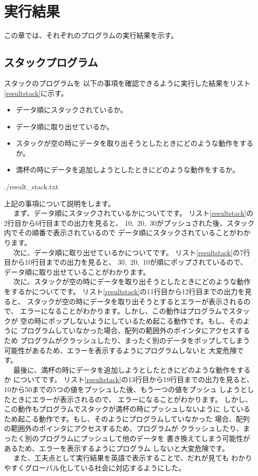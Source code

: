 \documentclass[a4j]{jarticle}
\begin{document}
\section{実行結果}
この章では、それぞれのプログラムの実行結果を示す。
\subsection{スタックプログラム}
\label{sec:stackresult}
スタックのプログラムを
以下の事項を確認できるように実行した結果をリスト\ref{resultstack}に示す。
\begin{itemize}
  \item データ順にスタックされているか。
  \item データ順に取り出せているか。
  \item スタックが空の時にデータを取り出そうとしたときにどのような動作をするか。
  \item 満杯の時にデータを追加しようとしたときにどのような動作をするか。
\end{itemize}

\begin{lstinputlisting}[caption=スタックプログラムの実行結果,label=resultstack]{./result_stack.txt}
\end{lstinputlisting}

上記の事項について説明をします。
\\~~
まず、データ順にスタックされているかについてです。
リスト\ref{resultstack}の2行目から6行目までの出力を見ると、
10,~20,~30がプッシュされた後、スタック内でその順番で表示されているので
データ順にスタックされていることがわかります。
\\~~
次に、データ順に取り出せているかについてです。
リスト\ref{resultstack}の7行目から10行目までの出力を見ると、
30,~20,~10が順にポップされているので、
データ順に取り出せていることがわかります。
\\~~
次に、スタックが空の時にデータを取り出そうとしたときにどのような動作
をするかについてです。
リスト\ref{resultstack}の11行目から12行目までの出力を見ると、
スタックが空の時にデータを取り出そうとするとエラーが表示されるので、
エラーになることがわかります。しかし、この動作はプログラムでスタックが
空の時にポップしないようにしているため起こる動作です。もし、そのように
プログラムしていなかった場合、配列の範囲外のポインタにアクセスするため
プログラムがクラッシュしたり、まったく別のデータをポップしてしまう
可能性があるため、エラーを表示するようにプログラムしないと
大変危険です。
\\~~
最後に、満杯の時にデータを追加しようとしたときにどのような動作をするか
についてです。
リスト\ref{resultstack}の13行目から19行目までの出力を見ると、
10から50までの5つの値をプッシュした後、もう一つの値をプッシュ
しようとしたときにエラーが表示されるので、
エラーになることがわかります。
しかし、この動作もプログラムでスタックが満杯の時にプッシュしないように
しているため起こる動作です。もし、そのようにプログラムしていなかった
場合、配列の範囲外のポインタにアクセスするため、プログラムが
クラッシュしたり、まったく別のプログラムにプッシュして他のデータを
書き換えてしまう可能性があるため、エラーを表示するようにプログラム
しないと大変危険です。
\\~~
また、工夫点として実行結果を英語で表示することで、だれが見ても
わかりやすくグローバル化している社会に対応するようにした。
\end{document}
